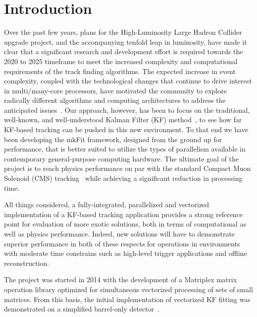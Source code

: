 \documentclass{webofc}
\def\mkfit{mkFit\xspace}
\begin{document}
\maketitle


\section{Introduction}

Over the past few years, plans for the High-Luminosity Large Hadron Collider
upgrade project, and the accompanying tenfold leap in luminosity, have made it
clear that a significant research and development effort is required towards the
2020 to 2025 timeframe to meet the increased complexity and computational
requirements of the track finding algorithms. The expected increase in event
complexity, coupled with the technological changes that continue to drive
interest in multi/many-core processors, have motivated the community to explore
radically different algorithms and computing architectures to address the
anticipated issues~\cite{CTD2018}. Our approach, however, has been to focus on
the traditional, well-known, and well-understood Kalman Filter (KF) method~\cite{Fruhwirth}, to
see how far KF-based tracking can be pushed in this new environment. To that
end we have been developing the \mkfit framework, designed from the ground up for
performance, that is better suited to utilize the types of parallelism available
in contemporary general-purpose computing hardware. The ultimate goal of the project is
to reach physics performance on par with the standard Compact Muon Solenoid (CMS)
tracking~\cite{CMS-tracking} while achieving a significant reduction in processing time.

All things considered, a fully-integrated, parallelized and vectorized implementation 
of a KF-based tracking application provides a strong reference point for evaluation 
of more exotic solutions, both in terms of computational as well as physics performance. 
Indeed, new solutions will have to demonstrate superior performance in both of these 
respects for operations in environments with moderate time constrains such as high-level 
trigger applications and offline reconstruction.


The project was started in 2014 with the development of a
Matriplex matrix operation library optimized for simultaneous vectorized
processing of sets of small matrices. From this basis, the initial
implementation of vectorized KF fitting was demonstrated on a simplified
barrel-only detector~\cite{pkf-fit}.
\end{document}
